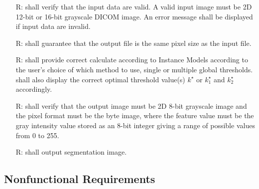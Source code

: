 \documentclass[12pt]{article}
\begin{document}
\noindent \begin{itemize}

\item[R\refstepcounter{reqnum}\thereqnum \label{R_Inputs}:] 
\famname{} shall verify that the input data are valid. A valid input image must be 2D 12-bit or 16-bit grayscale DICOM image. An error message shall be displayed if input data are invalid.

\item[R\refstepcounter{reqnum}\thereqnum \label{R_OutputInputs}:] 
\famname{} shall guarantee that the output file is the same pixel size as the input file.

\item[R\refstepcounter{reqnum}\thereqnum \label{R_Calculate}:]
\famname{} shall provide correct calculate according to Instance Models according to the user's choice of which method to use, single or multiple global thresholds. \famname{} shall also display the correct optimal threshold value(s) $k^{\star}$ or $k^{\star}_{1}$ and $k^{\star}_{2}$ accordingly. 

\item[R\refstepcounter{reqnum}\thereqnum \label{R_VerifyOutput}:] \famname{}
  shall verify that the output image must be 2D 8-bit grayscale image and the
  pixel format must be the byte image, where the feature value must be the gray
  intensity value stored as an 8-bit integer giving a range of possible values
  from 0 to 255. 

\item[R\refstepcounter{reqnum}\thereqnum \label{R_Outputk}:] 
\famname{} shall output segmentation image.

\end{itemize}

\subsection{Nonfunctional Requirements}
\end{document}
